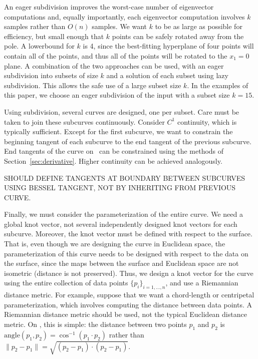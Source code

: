 An eager subdivision improves the worst-case number of eigenvector computations
and, equally importantly, each eigenvector computation involves $k$ samples
rather than $O(n)$ samples.
We want $k$ to be as large as possible for efficiency, 
but small enough that $k$ points can be safely rotated away from the pole.
A lowerbound for $k$ is 4, since the best-fitting hyperplane of 
four points will contain all of the points, and thus all of the points
will be rotated to the $x_1=0$ plane.
A combination of the two approaches can be used, with an eager
subdivision into subsets of size $k$ and a solution of each subset using
lazy subdivision.
This allows the safe use of a large subset size $k$.
In the examples of this paper, we choose an eager subdivision
of the input with a subset size $k=15$.

Using subdivision, several curves are designed, one per subset.
Care must be taken to join these subcurves continuously.
Consider $C^1$ continuity, which is typically sufficient.
Except for the first subcurve, we want to constrain the beginning
tangent of each subcurve to the end tangent of the previous subcurve.
End tangents of the curve on \ can be constrained
using the methods of Section~\ref{sec:derivative}.
Higher continuity can be achieved analogously.

SHOULD DEFINE TANGENTS AT BOUNDARY BETWEEN SUBCURVES USING BESSEL
TANGENT, NOT BY INHERITING FROM PREVIOUS CURVE.

Finally, we must consider the parameterization of the entire curve.
We need a global knot vector, not several independently designed knot vectors
for each subcurve.
Moreover, the knot vector must be defined with respect to the surface.
That is,
even though we are designing the curve in Euclidean space,
the parameterization of this curve needs to be designed 
with respect to the data
on the surface, since the maps between the surface and Euclidean space
are not isometric (distance is not preserved).
Thus, we design a knot vector for the curve using the entire collection
of data points $\{p_i\}_{i=1,\ldots,n}$, 
and use a Riemannian distance metric.
For example, suppose that we want
a chord-length or centripetal parameterization,
which involves computing the distance between data points.
A Riemannian distance metric should be used, not 
the typical Euclidean distance metric.
On , this is simple: the distance between two points $p_1$ and
$p_2$ is $\mbox{angle} (p_1,p_2) = \cos^{-1}(p_1 \cdot p_2)$ 
rather than $\|p_2 - p_1\| = \sqrt{(p_2 - p_1) \cdot (p_2 - p_1)}$.

